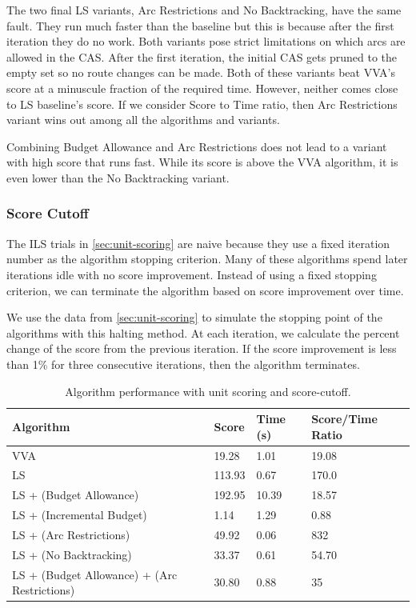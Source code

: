 \documentclass[honors]{union-cs-thesis}
\begin{document}
The two final LS variants, Arc Restrictions and No Backtracking, have the same fault. They run much faster than the baseline but this is because after the first iteration they do no work. Both variants pose strict limitations on which arcs are allowed in the CAS. After the first iteration, the initial CAS gets pruned to the empty set so no route changes can be made. Both of these variants beat VVA's score at a minuscule fraction of the required time. However, neither comes close to LS baseline's score. If we consider Score to Time ratio, then Arc Restrictions variant wins out among all the algorithms and variants.

Combining Budget Allowance and Arc Restrictions does not lead to a variant with high score that runs fast. While its score is above the VVA algorithm, it is even lower than the No Backtracking variant.


\subsubsection{Score Cutoff}
\label{sec:score-cutoff}
The ILS trials in \cref{sec:unit-scoring} are naive because they use a fixed iteration number as the algorithm stopping criterion. Many of these algorithms spend later iterations idle with no score improvement. Instead of using a fixed stopping criterion, we can terminate the algorithm based on score improvement over time. 

We use the data from \cref{sec:unit-scoring} to simulate the stopping point of the algorithms with this halting method. At each iteration, we calculate the percent change of the score from the previous iteration. If the score improvement is less than 1\% for three consecutive iterations, then the algorithm terminates.    

\begin{table}
\begin{center}
\begin{tabular}{|l|l|l|l|}
    \hline
    \textbf{Algorithm} & \textbf{Score} & \textbf{Time (s)} & \textbf{Score/Time Ratio} \\
    \hline
    VVA & 19.28 & 1.01 & 19.08 \\
    \hline
    LS & 113.93 & 0.67 & 170.0 \\
    \hline
    LS + (Budget Allowance) & 192.95 & 10.39 & 18.57 \\
    \hline
    LS + (Incremental Budget) & 1.14 & 1.29 & 0.88 \\
    \hline
    LS + (Arc Restrictions) & 49.92 & 0.06 & 832 \\
    \hline
    LS + (No Backtracking) & 33.37 & 0.61 & 54.70 \\
    \hline
    LS + (Budget Allowance) + (Arc Restrictions) & 30.80 & 0.88 & 35  \\
    \hline
\end{tabular}
\caption{Algorithm performance with unit scoring and score-cutoff.}
\label{tab:score-cuttoff-results}
\end{center}
\end{table}
\end{document}
